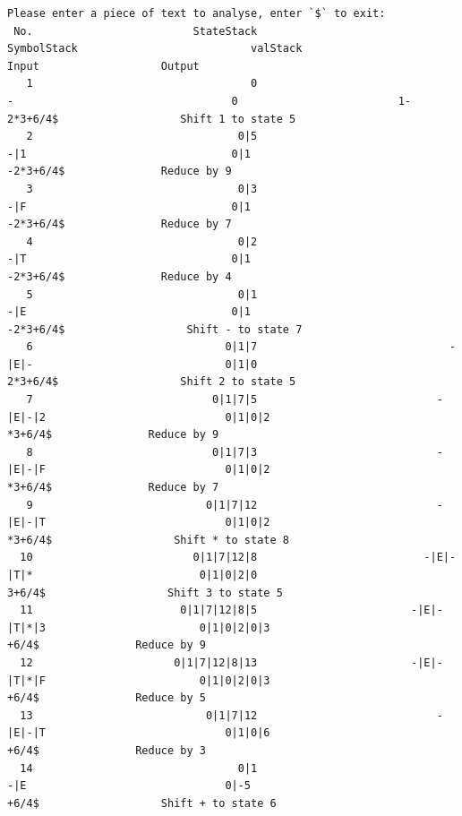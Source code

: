 \documentclass[UTF8]{ctexart}
\begin{document}
\begin{lstlisting}
Please enter a piece of text to analyse, enter `$` to exit:
 No.                         StateStack                        SymbolStack                           valStack                              Input                   Output
   1                                  0                                  -                                  0                         1-2*3+6/4$                   Shift 1 to state 5
   2                                0|5                                -|1                                0|1                          -2*3+6/4$               Reduce by 9
   3                                0|3                                -|F                                0|1                          -2*3+6/4$               Reduce by 7
   4                                0|2                                -|T                                0|1                          -2*3+6/4$               Reduce by 4
   5                                0|1                                -|E                                0|1                          -2*3+6/4$                   Shift - to state 7
   6                              0|1|7                              -|E|-                              0|1|0                           2*3+6/4$                   Shift 2 to state 5
   7                            0|1|7|5                            -|E|-|2                            0|1|0|2                            *3+6/4$               Reduce by 9
   8                            0|1|7|3                            -|E|-|F                            0|1|0|2                            *3+6/4$               Reduce by 7
   9                           0|1|7|12                            -|E|-|T                            0|1|0|2                            *3+6/4$                   Shift * to state 8
  10                         0|1|7|12|8                          -|E|-|T|*                          0|1|0|2|0                             3+6/4$                   Shift 3 to state 5
  11                       0|1|7|12|8|5                        -|E|-|T|*|3                        0|1|0|2|0|3                              +6/4$               Reduce by 9
  12                      0|1|7|12|8|13                        -|E|-|T|*|F                        0|1|0|2|0|3                              +6/4$               Reduce by 5
  13                           0|1|7|12                            -|E|-|T                            0|1|0|6                              +6/4$               Reduce by 3
  14                                0|1                                -|E                               0|-5                              +6/4$                   Shift + to state 6

\end{lstlisting}
\end{document}
